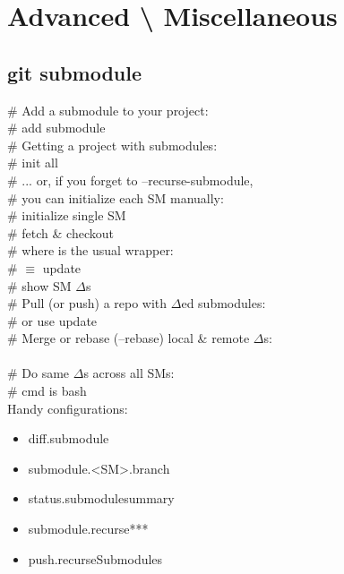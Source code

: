\section{Advanced \textbackslash \hspace{1mm} Miscellaneous}

\subsection*{git submodule}
\# Add a submodule to your project:\\
 \# add submodule \\
\# Getting a project with submodules:\\
 \# init all\\
\# ... or, if you forget to --recurse-submodule, \\
\# you can initialize each SM manually:\\
 \# initialize single SM \\
 \# fetch \& checkout \\
\# where  is the usual wrapper:\\
 \# $\equiv$ update \\
 \# show SM $\Delta$s \\
\# Pull (or push) a repo with $\Delta$ed submodules:\\
 \# or use update \\
\# Merge or rebase (--rebase) local \& remote $\Delta$s:\\
\\
\# Do same $\Delta$s across all SMs:\\
 \# cmd is bash\\
Handy configurations:
{\scriptsize
\begin{itemize}
\item diff.submodule
\item submodule.<SM>.branch
\item status.submodulesummary
\item submodule.recurse***
\item push.recurseSubmodules
\end{itemize}}
\\


